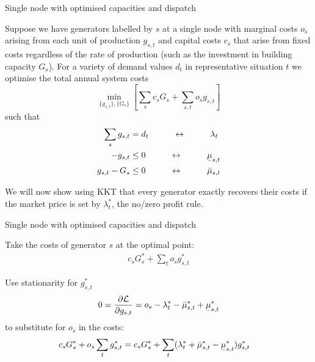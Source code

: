 \documentclass[10pt,aspectratio=169,dvipsnames]{beamer}
\def\l{\lambda}
\def\m{\mu}
\def\d{\partial}
\def\cL{\mathcal{L}}
\newcommand{\ubar}[1]{\text{\b{$#1$}}}
\begin{document}
\begin{frame}{Single node with optimised capacities and dispatch}

  Suppose we have generators labelled by $s$ at a single node with \alert{marginal costs} $o_s$ arising from each unit of
  production $g_{s,t}$ and \alert{capital costs} $c_s$ that arise from fixed costs
  regardless of the rate of production (such as the investment in building
  capacity $G_s$).   For a variety of demand values $d_t$ in representative situation $t$ we optimise the total annual system costs
  \begin{equation*}
    \min_{\{g_{s,t}\},\{G_s\}}  \left[\sum_{s}c_s G_s +  \sum_{s,t} o_{s} g_{s,t} \right]
  \end{equation*}
  such that
  \begin{align*}
    \sum_s g_{s,t} & = d_t  \hspace{1cm}\leftrightarrow\hspace{1cm} \l_t \\
    - g_{s,t}  & \leq  0  \hspace{1cm}\leftrightarrow\hspace{1cm} \ubar{\m}_{s,t} \\
    g_{s,t} - G_s  & \leq 0  \hspace{1cm}\leftrightarrow\hspace{1cm} \bar{\m}_{s,t}
  \end{align*}

  We will now show using KKT that every generator exactly recovers their costs if the market price is set by $\l_t^*$, the \alert{no/zero profit rule}.
\end{frame}


\begin{frame}{Single node with optimised capacities and dispatch}

  Take the costs of generator $s$ at the optimal point:
  \begin{align*}
    c_s G_s^* +  \sum_{t}  o_{s} g_{s,t}^*
  \end{align*}

  Use stationarity for $g_{s,t}^*$
  \begin{align*}
        0 = \frac{\d \cL}{\d g_{s,t}}  = o_s - \l_t^* - \bar{\m}^*_{s,t} + \ubar{\m}^*_{s,t}
  \end{align*}
  to substitute for $o_s$ in the costs:
  \begin{align*}
    c_s G_s^* +  o_{s} \sum_{t}  g_{s,t}^* & =  c_s G_s^* + \sum_{t}( \l_t^* + \bar{\m}^*_{s,t} - \ubar{\m}^*_{s,t}) g_{s,t}^*
  \end{align*}
\end{frame}
\end{document}
